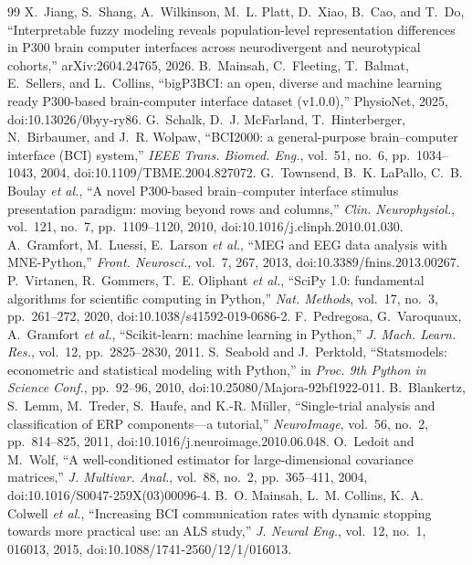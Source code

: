 \documentclass[conference]{IEEEtran}
\begin{document}
\begin{thebibliography}{99}
 X.~Jiang, S.~Shang, A.~Wilkinson, M.~L. Platt, D.~Xiao, B.~Cao, and T.~Do, ``Interpretable fuzzy modeling reveals population-level representation differences in P300 brain computer interfaces across neurodivergent and neurotypical cohorts,'' arXiv:2604.24765, 2026.
 B.~Mainsah, C.~Fleeting, T.~Balmat, E.~Sellers, and L.~Collins, ``bigP3BCI: an open, diverse and machine learning ready P300-based brain-computer interface dataset (v1.0.0),'' PhysioNet, 2025, doi:10.13026/0byy-ry86.
 G.~Schalk, D.~J. McFarland, T.~Hinterberger, N.~Birbaumer, and J.~R. Wolpaw, ``BCI2000: a general-purpose brain--computer interface (BCI) system,'' \emph{IEEE Trans. Biomed. Eng.}, vol.~51, no.~6, pp.~1034--1043, 2004, doi:10.1109/TBME.2004.827072.
 G.~Townsend, B.~K. LaPallo, C.~B. Boulay \emph{et al.}, ``A novel P300-based brain--computer interface stimulus presentation paradigm: moving beyond rows and columns,'' \emph{Clin. Neurophysiol.}, vol.~121, no.~7, pp.~1109--1120, 2010, doi:10.1016/j.clinph.2010.01.030.
 A.~Gramfort, M.~Luessi, E.~Larson \emph{et al.}, ``MEG and EEG data analysis with MNE-Python,'' \emph{Front. Neurosci.}, vol.~7, 267, 2013, doi:10.3389/fnins.2013.00267.
 P.~Virtanen, R.~Gommers, T.~E. Oliphant \emph{et al.}, ``SciPy 1.0: fundamental algorithms for scientific computing in Python,'' \emph{Nat. Methods}, vol.~17, no.~3, pp.~261--272, 2020, doi:10.1038/s41592-019-0686-2.
 F.~Pedregosa, G.~Varoquaux, A.~Gramfort \emph{et al.}, ``Scikit-learn: machine learning in Python,'' \emph{J. Mach. Learn. Res.}, vol.~12, pp.~2825--2830, 2011.
 S.~Seabold and J.~Perktold, ``Statsmodels: econometric and statistical modeling with Python,'' in \emph{Proc. 9th Python in Science Conf.}, pp.~92--96, 2010, doi:10.25080/Majora-92bf1922-011.
 B.~Blankertz, S.~Lemm, M.~Treder, S.~Haufe, and K.-R. M\"{u}ller, ``Single-trial analysis and classification of ERP components---a tutorial,'' \emph{NeuroImage}, vol.~56, no.~2, pp.~814--825, 2011, doi:10.1016/j.neuroimage.2010.06.048.
 O.~Ledoit and M.~Wolf, ``A well-conditioned estimator for large-dimensional covariance matrices,'' \emph{J. Multivar. Anal.}, vol.~88, no.~2, pp.~365--411, 2004, doi:10.1016/S0047-259X(03)00096-4.
 B.~O. Mainsah, L.~M. Collins, K.~A. Colwell \emph{et al.}, ``Increasing BCI communication rates with dynamic stopping towards more practical use: an ALS study,'' \emph{J. Neural Eng.}, vol.~12, no.~1, 016013, 2015, doi:10.1088/1741-2560/12/1/016013.

\end{thebibliography}
\end{document}

